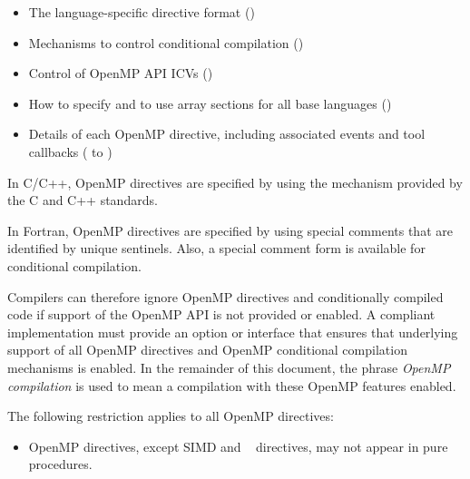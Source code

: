 \begin{itemize}
\item The language-specific directive format 
()

\item Mechanisms to control conditional compilation 
()

\item Control of OpenMP API ICVs 
()

\item How to specify and to use array sections for all base languages 
() 

\item Details of each OpenMP directive, including associated events and tool callbacks 
( to 
) 
\end{itemize}

\begin{ccppspecific}
In C/C++, OpenMP directives are specified by using the  mechanism provided 
by the C and C++ standards. 
\end{ccppspecific}

\begin{fortranspecific}
In Fortran, OpenMP directives are specified by using special comments that are 
identified by unique sentinels. Also, a special comment form is available for conditional 
compilation. 
\end{fortranspecific}

Compilers can therefore ignore OpenMP directives and conditionally compiled code if 
support of the OpenMP API is not provided or enabled. A compliant implementation 
must provide an option or interface that ensures that underlying support of all OpenMP 
directives and OpenMP conditional compilation mechanisms is enabled. In the 
remainder of this document, the phrase \emph{OpenMP compilation} is used to mean a 
compilation with these OpenMP features enabled.

\begin{samepage}
\begin{fortranspecific}
\restrictions
The following restriction applies to all OpenMP directives: 
\begin{itemize}
\item OpenMP directives, except SIMD and ~ directives,
 may not appear in pure procedures.
\end{itemize}
\end{fortranspecific}
\end{samepage}


